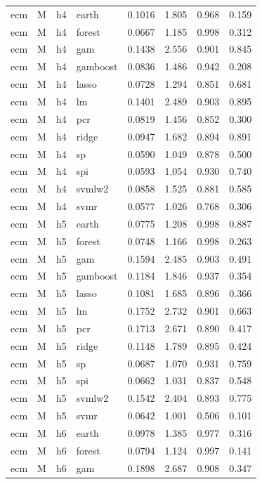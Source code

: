 \begin{ThreePartTable}
\begin{longtable}[t]{llclcccc}
\addlinespace
ecm & M & h4 & earth & 0.1016 & 1.805 & 0.968 & 0.159\\
ecm & M & h4 & forest & 0.0667 & 1.185 & 0.998 & 0.312\\
ecm & M & h4 & gam & 0.1438 & 2.556 & 0.901 & 0.845\\
ecm & M & h4 & gamboost & 0.0836 & 1.486 & 0.942 & 0.208\\
ecm & M & h4 & lasso & 0.0728 & 1.294 & 0.851 & 0.681\\
ecm & M & h4 & lm & 0.1401 & 2.489 & 0.903 & 0.895\\
ecm & M & h4 & pcr & 0.0819 & 1.456 & 0.852 & 0.300\\
ecm & M & h4 & ridge & 0.0947 & 1.682 & 0.894 & 0.891\\
ecm & M & h4 & sp & 0.0590 & 1.049 & 0.878 & 0.500\\
ecm & M & h4 & spi & 0.0593 & 1.054 & 0.930 & 0.740\\
ecm & M & h4 & svmlw2 & 0.0858 & 1.525 & 0.881 & 0.585\\
ecm & M & h4 & svmr & 0.0577 & 1.026 & 0.768 & 0.306\\
\addlinespace
ecm & M & h5 & earth & 0.0775 & 1.208 & 0.998 & 0.887\\
ecm & M & h5 & forest & 0.0748 & 1.166 & 0.998 & 0.263\\
ecm & M & h5 & gam & 0.1594 & 2.485 & 0.903 & 0.491\\
ecm & M & h5 & gamboost & 0.1184 & 1.846 & 0.937 & 0.354\\
ecm & M & h5 & lasso & 0.1081 & 1.685 & 0.896 & 0.366\\
ecm & M & h5 & lm & 0.1752 & 2.732 & 0.901 & 0.663\\
ecm & M & h5 & pcr & 0.1713 & 2.671 & 0.890 & 0.417\\
ecm & M & h5 & ridge & 0.1148 & 1.789 & 0.895 & 0.424\\
ecm & M & h5 & sp & 0.0687 & 1.070 & 0.931 & 0.759\\
ecm & M & h5 & spi & 0.0662 & 1.031 & 0.837 & 0.548\\
ecm & M & h5 & svmlw2 & 0.1542 & 2.404 & 0.893 & 0.775\\
ecm & M & h5 & svmr & 0.0642 & 1.001 & 0.506 & 0.101\\
\addlinespace
ecm & M & h6 & earth & 0.0978 & 1.385 & 0.977 & 0.316\\
ecm & M & h6 & forest & 0.0794 & 1.124 & 0.997 & 0.141\\
ecm & M & h6 & gam & 0.1898 & 2.687 & 0.908 & 0.347\\

\end{longtable}
\end{ThreePartTable}
